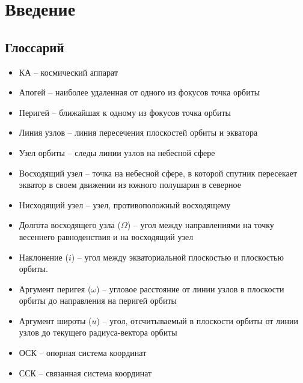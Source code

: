 \usetikzlibrary{calc}
\usetikzlibrary{intersections}
\usetikzlibrary{angles}
\usetikzlibrary{quotes}

\chapter{Введение}
\section{Глоссарий}
\begin{itemize}
  \item КА -- космический аппарат
  \item Апогей -- наиболее удаленная от одного из фокусов точка орбиты
  \item Перигей -- ближайшая к одному из фокусов точка орбиты
  \item Линия узлов -- линия пересечения плоскостей орбиты и экватора
  \item Узел орбиты -- следы линии узлов на небесной сфере
  \item Восходящий узел -- точка на небесной сфере, в которой спутник пересекает
  экватор в своем движении из южного полушария в северное
  \item Нисходящий узел -- узел, противоположный восходящему
  \item Долгота восходящего узла ($\Omega$) -- угол между направлениями на точку весеннего
  равноденствия и на восходящий узел
  \item Наклонение ($i$) -- угол между экваториальной плоскостью и плоскостью орбиты.
  \item Аргумент перигея ($\omega$) -- угловое расстояние от линии узлов в плоскости
  орбиты до направления на перигей орбиты
  \item Аргумент широты ($u$) -- угол, отсчитываемый в плоскости орбиты от линии
  узлов до текущего радиуса-вектора орбиты
  \item ОСК -- опорная система координат
  \item ССК -- связанная система координат
\end{itemize}
